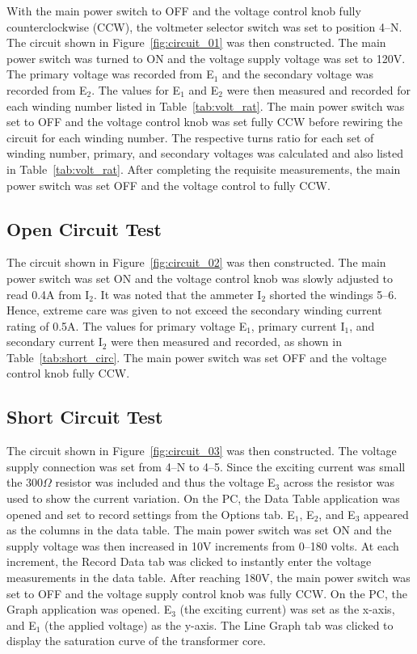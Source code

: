 \documentclass{article}
\begin{document}
\label{part1} With the main power switch to OFF and the voltage control knob
fully counterclockwise (CCW), the voltmeter selector switch was set to position
4--N. The circuit shown in Figure~\ref{fig:circuit_01}  was then constructed.
The main power switch was turned to ON and the voltage supply voltage was set
to 120V. The primary voltage was recorded from E$_1$ and the secondary voltage
was recorded from E$_2$.  The values for E$_1$ and E$_2$ were then measured and
recorded for each winding number listed in Table~\ref{tab:volt_rat}. The main
power switch was set to OFF and the voltage control knob was set fully CCW
before rewiring the circuit for each winding number. The respective turns ratio
for each set of winding number, primary, and secondary voltages was calculated
and also listed in Table~\ref{tab:volt_rat}. After completing the requisite
measurements, the main power switch was set OFF and the voltage control to
fully CCW.

\subsection{Open Circuit Test}

\label{part2} The circuit shown in Figure~\ref{fig:circuit_02} was then
constructed. The main power switch was set ON and the voltage control knob was
slowly adjusted to read 0.4A from I$_2$. It was noted that the ammeter I$_2$
shorted the windings 5--6.  Hence, extreme care was given to not exceed the
secondary winding current rating of 0.5A. The values for primary voltage E$_1$,
primary current I$_1$, and secondary current I$_2$ were then measured and
recorded, as shown in Table~\ref{tab:short_circ}.  The main power switch was set
OFF and the voltage control knob fully CCW.

\subsection{Short Circuit Test}

\label{part3} The circuit shown in Figure~\ref{fig:circuit_03} was then
constructed. The voltage supply connection was set from 4--N to 4--5. Since the
exciting current was small the 300$\Omega$ resistor was included and thus the
voltage E$_3$ across the resistor was used to show the current variation. On
the PC, the Data Table application was opened and set to record settings from
the Options tab. E$_1$, E$_2$, and E$_3$ appeared as the columns in the data
table. The main power switch was set ON and the supply voltage was then
increased in 10V increments from 0--180 volts. At each increment, the Record
Data tab was clicked to instantly enter the voltage measurements in the data
table. After reaching 180V, the main power switch was set to OFF and the
voltage supply control knob was fully {CCW}. On the {PC}, the Graph application
was opened.  E$_3$ (the exciting current) was set as the x-axis, and E$_1$ (the
applied voltage) as the y-axis. The Line Graph tab was clicked to display the
saturation curve of the transformer core.
\end{document}
